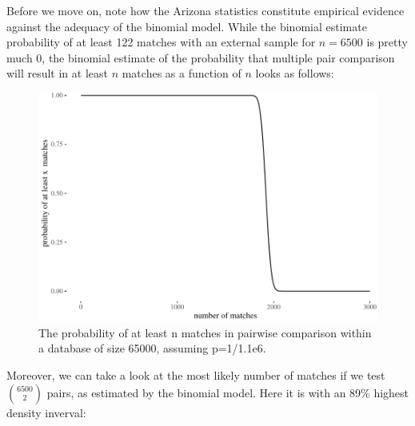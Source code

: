 \documentclass[10pt,dvipsnames,enabledeprecatedfontcommands]{scrartcl}
\begin{document}
Before we move on, note how the Arizona statistics constitute empirical
evidence against the adequacy of the binomial model. While the binomial
estimate probability of at least 122 matches with an external sample for
\(n=6500\) is pretty much 0, the binomial estimate of the probability
that multiple pair comparison will result in at least \(n\) matches as a
function of \(n\) looks as follows:

\begin{figure}

{\centering \includegraphics[width=1\linewidth]{lr-chapter_files/figure-latex/unnamed-chunk-6-1} 

}

\caption{The probability of at least n matches in pairwise comparison within a database of size 65000, assuming p=1/1.1e6.}\label{fig:unnamed-chunk-6}
\end{figure}

\noindent Moreover, we can take a look at the most likely number of
matches if we test \({6500 \choose 2}\) pairs, as estimated by the
binomial model. Here it is with an 89\% highest density inverval:
\end{document}
